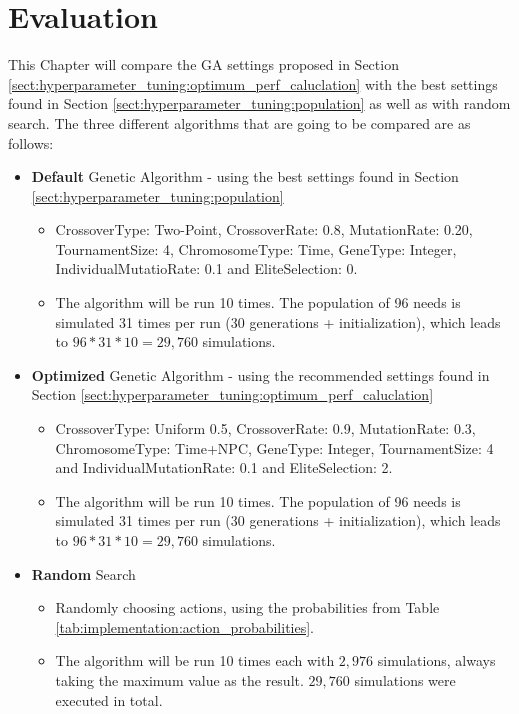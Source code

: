 \chapter{Evaluation}
\label{chap:evaluation}
This Chapter will compare the GA settings proposed in Section \ref{sect:hyperparameter_tuning:optimum_perf_caluclation} with the best settings found in Section \ref{sect:hyperparameter_tuning:population} as well as with random search. The three different algorithms that are going to be compared are as follows:
\begin{itemize}
	\item \textbf{Default} Genetic Algorithm - using the best settings found in Section \ref{sect:hyperparameter_tuning:population}
	\begin{itemize}
		\item CrossoverType: Two-Point, CrossoverRate: 0.8, MutationRate: 0.20, TournamentSize: 4, ChromosomeType: Time, GeneType: Integer, IndividualMutatioRate: 0.1 and EliteSelection: 0. 
		\item The algorithm will be run 10 times. The population of 96 needs is simulated 31 times per run (30 generations + initialization), which leads to $96 * 31 * 10 = 29,760$ simulations.
	\end{itemize}
	\item \textbf{Optimized} Genetic Algorithm - using the recommended settings found in Section \ref{sect:hyperparameter_tuning:optimum_perf_caluclation}
	\begin{itemize}
		\item CrossoverType: Uniform 0.5, CrossoverRate: 0.9, MutationRate: 0.3, ChromosomeType: Time+NPC, GeneType: Integer, TournamentSize: 4 and IndividualMutationRate: 0.1 and EliteSelection: 2. 
		\item The algorithm will be run 10 times. The population of 96 needs is simulated 31 times per run (30 generations + initialization), which leads to $96 * 31 * 10 = 29,760$ simulations.
	\end{itemize}
	\item \textbf{Random} Search
	\begin{itemize}
		\item Randomly choosing actions, using the probabilities from Table \ref{tab:implementation:action_probabilities}. 
		\item The algorithm will be run 10 times each with $2,976$ simulations, always taking the maximum value as the result. $29,760$ simulations were executed in total.
	\end{itemize}
\end{itemize}


